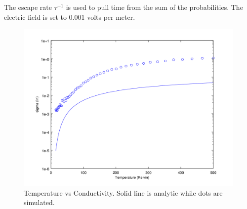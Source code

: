 \documentclass[11pt]{article}
\begin{document}
The escape rate $\tau^{-1}$ is used to pull time from the sum of the probabilities. The electric field is set to 0.001 volts per meter.  

 \begin{figure}[htbp]
\begin{center}
\includegraphics[scale=.50]{TvSigUnits.png}
\caption{Temperature vs Conductivity. Solid line is analytic while dots are simulated.}
\label{TvSig}
\end{center}
\end{figure}
\end{document}
